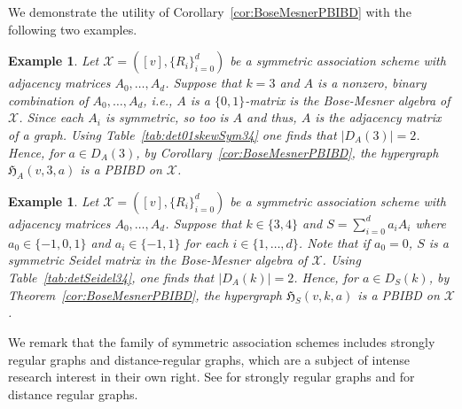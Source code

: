 \documentclass[11pt]{article}
\newtheorem{example}[theorem]{Example}
\begin{document}
We demonstrate the utility of Corollary~\ref{cor:BoseMesnerPBIBD} with the following two examples.

\begin{example} 
\label{ex:symassPBIBD1}
Let $\mathcal{X}=([v],\{R_i\}_{i=0}^d)$ be a symmetric association scheme with adjacency matrices $A_0,\dots,A_d$.
    Suppose that $k=3$ and $A$ is a nonzero, binary combination of $A_0,\dots,A_d$, i.e., $A$ is a $\{0,1\}$-matrix is the Bose-Mesner algebra of $\mathcal X$.
    Since each $A_i$ is symmetric, so too is $A$ and thus, $A$ is the adjacency matrix of a graph.
Using Table~\ref{tab:det01skewSym34} one finds that $|D_A(3)|=2$.
Hence, for $a \in D_A(3)$, by Corollary~\ref{cor:BoseMesnerPBIBD}, the hypergraph $\mathfrak H_{A}(v,3,a)$ is a PBIBD on $\mathcal{X}$. 
\end{example}

\begin{example} 
\label{ex:symassPBIBD2}
Let $\mathcal{X}=([v],\{R_i\}_{i=0}^d)$ be a symmetric association scheme with adjacency matrices $A_0,\dots,A_d$.
    Suppose that $k\in\{3,4\}$ and $S=\sum_{i=0}^d a_i A_i$ where $a_0\in \{-1,0,1\}$ and $a_i\in\{-1,1\}$ for each $i\in\{1,\ldots,d\}$.
    Note that if $a_0=0$, $S$ is a symmetric Seidel matrix in the Bose-Mesner algebra of $\mathcal X$.
Using Table~\ref{tab:detSeidel34}, one finds that $|D_A(k)|=2$.
Hence, for $a \in D_S(k)$, by Theorem~\ref{cor:BoseMesnerPBIBD}, the hypergraph $\mathfrak H_{S}(v,k,a)$ is a PBIBD on $\mathcal{X}$.  
\end{example}

We remark that the family of symmetric association schemes includes strongly regular graphs and distance-regular graphs, which are a subject of intense research interest in their own right. 
See \cite{SRG} for strongly regular graphs and \cite{BCN, DRG} for distance regular graphs.
\end{document}
